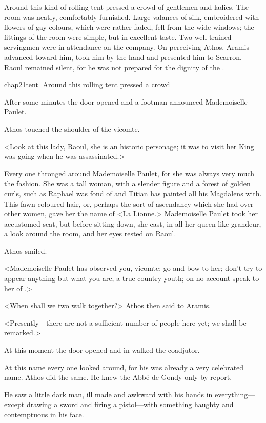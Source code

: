 Around this kind of rolling tent pressed a crowd of gentlemen and ladies. The room was neatly, comfortably furnished. Large valances of silk, embroidered with flowers of gay colours, which were rather faded, fell from the wide windows; the fittings of the room were simple, but in excellent taste. Two well trained servingmen were in attendance on the company. On perceiving Athos, Aramis advanced toward him, took him by the hand and presented him to Scarron. Raoul remained silent, for he was not prepared for the dignity of the .

\begin{bwbigpic}
	[\basicscale] 
	{chap21tent}
	[Around this rolling tent pressed a crowd]
\end{bwbigpic}

After some minutes the door opened and a footman announced Mademoiselle Paulet.

Athos touched the shoulder of the vicomte.

<Look at this lady, Raoul, she is an historic personage; it was to visit her King  was going when he was assassinated.>

Every one thronged around Mademoiselle Paulet, for she was always very much the fashion. She was a tall woman, with a slender figure and a forest of golden curls, such as Raphael was fond of and Titian has painted all his Magdalens with. This fawn-coloured hair, or, perhaps the sort of ascendancy which she had over other women, gave her the name of <La Lionne.> Mademoiselle Paulet took her accustomed seat, but before sitting down, she cast, in all her queen-like grandeur, a look around the room, and her eyes rested on Raoul.

Athos smiled.

<Mademoiselle Paulet has observed you, vicomte; go and bow to her; don't try to appear anything but what you are, a true country youth; on no account speak to her of .>

<When shall we two walk together?> Athos then said to Aramis.

<Presently—there are not a sufficient number of people here yet; we shall be remarked.>

At this moment the door opened and in walked the coadjutor.

At this name every one looked around, for his was already a very celebrated name. Athos did the same. He knew the Abbé de Gondy only by report.

He saw a little dark man, ill made and awkward with his hands in everything—except drawing a sword and firing a pistol—with something haughty and contemptuous in his face.

